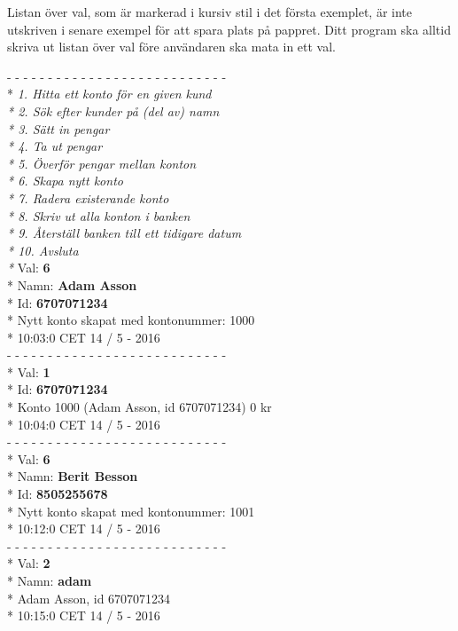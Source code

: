 Listan över val, som är markerad i kursiv stil i det första exemplet, är inte utskriven i senare exempel för att spara plats på pappret. Ditt program ska alltid skriva ut listan över val före användaren ska mata in ett val.
\begin{multicols}{2}
\noindent
- - - - - - - - - - - - - - - - - - - - - - - - - - -\\*
\textit{
1.   Hitta ett konto för en given kund\\*
2.   Sök efter kunder på (del av) namn\\*
3.   Sätt in pengar\\*
4.   Ta ut pengar\\*
5.   Överför pengar mellan konton\\*
6.   Skapa nytt konto\\*
7.   Radera existerande konto\\*
8.   Skriv ut alla konton i banken\\*
9.   Återställ banken till ett tidigare datum\\*
10.  Avsluta\\*
}
Val: \textbf{6}\\*
Namn: \textbf{Adam Asson}\\*
Id: \textbf{6707071234}\\*
Nytt konto skapat med kontonummer: 1000\\*
10:03:0 CET 14 / 5 - 2016\\
- - - - - - - - - - - - - - - - - - - - - - - - - - -\\*
Val: \textbf{1}\\*
Id: \textbf{6707071234}\\*
Konto 1000 (Adam Asson, id 6707071234) 0 kr\\*
10:04:0 CET 14 / 5 - 2016\\
- - - - - - - - - - - - - - - - - - - - - - - - - - -\\*
Val: \textbf{6}\\*
Namn: \textbf{Berit Besson}\\*
Id: \textbf{8505255678}\\*
Nytt konto skapat med kontonummer: 1001\\*
10:12:0 CET 14 / 5 - 2016\\
- - - - - - - - - - - - - - - - - - - - - - - - - - -\\*
Val: \textbf{2}\\*
Namn: \textbf{adam}\\*
Adam Asson, id 6707071234\\*
10:15:0 CET 14 / 5 - 2016\\

\end{multicols}
